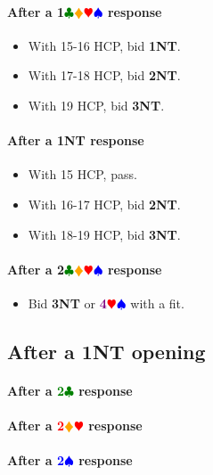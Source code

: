 \documentclass{article}
\newcommand{\Hs}{\textcolor{Red}{$\varheart$}}
\newcommand{\Ss}{\textcolor{Blue}{$\spadesuit$}}
\newcommand{\Ds}{\textcolor{Orange}{$\vardiamond$}}
\newcommand{\Cs}{\textcolor{Green}{$\clubsuit$}}
\newcommand{\NTs}{\textbf{\footnotesize{NT}}}
\renewcommand{\S}[1]{\textcolor{Blue}{\textbf{#1}\Ss}}
\newcommand{\C}[1]{\textcolor{Green}{\textbf{#1}\Cs}}
\newcommand{\NT}[1]{\textbf{#1\NTs}}
\newcommand{\suits}[1]{\textbf{#1}\Cs\Ds\Hs\Ss}
\newcommand{\majors}[1]{\textcolor{Purple}{\textbf{#1}}\Hs\Ss}
\newcommand{\reds}[1]{\textcolor{Red}{\textbf{#1}}\Ds\Hs}
\begin{document}

\paragraph{After a \suits{1} response}

\begin{itemize}
\item With 15-16 HCP, bid \NT{1}.
\item With 17-18 HCP, bid \NT{2}.
\item With 19 HCP, bid \NT{3}.
\end{itemize}

\paragraph{After a \NT{1} response}

\begin{itemize}
\item With 15 HCP, pass.
\item With 16-17 HCP, bid \NT{2}.
\item With 18-19 HCP, bid \NT{3}.
\end{itemize}

\paragraph{After a \suits{2} response}

\begin{itemize}
\item Bid \NT{3} or \majors{4} with a fit.
\end{itemize}


\subsection{After a \NT{1} opening}

\paragraph{After a \C{2} response}

\paragraph{After a \reds{2}  response}

\paragraph{After a \S{2} response}
\end{document}
